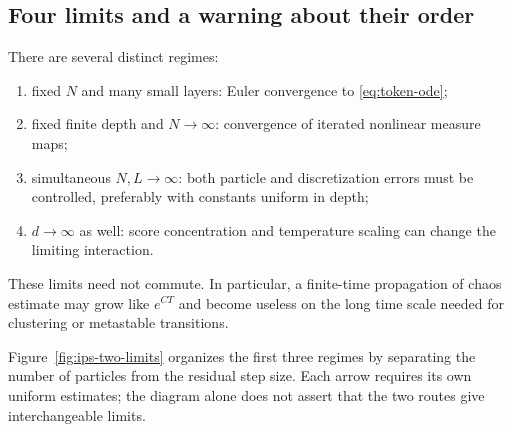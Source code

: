\documentclass[11pt]{amsart}
\numberwithin{equation}{section}
\theoremstyle{plain}
\begin{document}
\subsection{Four limits and a warning about their order}
There are several distinct regimes:
\begin{enumerate}[label=(\roman*),leftmargin=*]
 \item fixed $N$ and many small layers: Euler convergence to
 \eqref{eq:token-ode};
 \item fixed finite depth and $N\to\infty$: convergence of iterated nonlinear
 measure maps;
 \item simultaneous $N,L\to\infty$: both particle and discretization errors
 must be controlled, preferably with constants uniform in depth;
 \item $d\to\infty$ as well: score concentration and temperature scaling can
 change the limiting interaction.
\end{enumerate}
These limits need not commute.  In particular, a finite-time propagation of
chaos estimate may grow like $e^{CT}$ and become useless on the long time scale
needed for clustering or metastable transitions.

Figure~\ref{fig:ips-two-limits} organizes the first three regimes by
separating the number of particles from the residual step size.  Each arrow
requires its own uniform estimates; the diagram alone does not assert that
the two routes give interchangeable limits.
\end{document}
